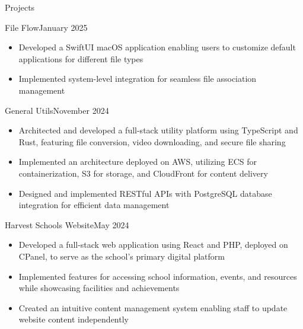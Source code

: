 \documentclass{article}
\newlength{\tabin}
\newlength{\secsep}
\newcommand{\lineunder}{\vspace*{-8pt} \\ \hspace*{-6pt} \hrulefill \\ \vspace*{-15pt}}
\newenvironment{tabbedsection}[1]{
    \begin{list}{}{
        \setlength{\itemsep}{0pt}
        \setlength{\labelsep}{0pt}
        \setlength{\labelwidth}{0pt}
        \setlength{\leftmargin}{\tabin}
        \setlength{\rightmargin}{\tabin}
        \setlength{\listparindent}{0pt}
        \setlength{\parsep}{0pt}
        \setlength{\parskip}{0pt}
        \setlength{\partopsep}{0pt}
        \setlength{\topsep}{#1}
    }
        \item[]
        }{
    \end{list}}
\newenvironment{resume_section}[1]{
    \vspace{2\secsep}
    \textsc{\large#1}
    \lineunder
    \begin{tabbedsection}{\secsep}
    }{\end{tabbedsection}}
\newenvironment{resume_subsection}[2]{
    \begin{minipage}[t]{0.75\linewidth}
        \textbf{#1}
    \end{minipage}%
    \begin{minipage}[t]{0.25\linewidth}
        \hfill \footnotesize #2
    \end{minipage}
    \begin{tabbedsection}{0.5\secsep}
    }{\end{tabbedsection}}
\newenvironment{subitems}{
    \renewcommand{\labelitemi}{-}
    \begin{itemize}
        \setlength{\labelsep}{1em}
        }{
    \end{itemize}}
\begin{document}
    \begin{resume_section}{Projects}
        \begin{resume_subsection}{File Flow}{January 2025}
            \begin{subitems}
                \item Developed a SwiftUI macOS application enabling users to customize default applications for different file types
                \item Implemented system-level integration for seamless file association management
            \end{subitems}
        \end{resume_subsection}

        \begin{resume_subsection}{General Utils}{November 2024}
            \begin{subitems}
                \item Architected and developed a full-stack utility platform using TypeScript and Rust, featuring file conversion, video downloading, and secure file sharing
                \item Implemented an architecture deployed on AWS, utilizing ECS for containerization, S3 for storage, and CloudFront for content delivery
                \item Designed and implemented RESTful APIs with PostgreSQL database integration for efficient data management
            \end{subitems}
        \end{resume_subsection}

        \begin{resume_subsection}{Harvest Schools Website}{May 2024}
            \begin{subitems}
                \item Developed a full-stack web application using React and PHP, deployed on CPanel, to serve as the school's primary digital platform
                \item Implemented features for accessing school information, events, and resources while showcasing facilities and achievements
                \item Created an intuitive content management system enabling staff to update website content independently
            \end{subitems}
        \end{resume_subsection}


\end{resume_section}
\end{document}
